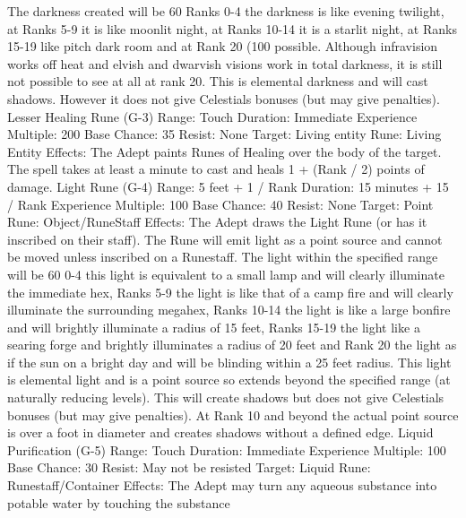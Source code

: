 \documentclass[a4paper]{article}
\begin{document}
\begin{multicols}{3}
The darkness created will be 60%
Ranks 0-4 the darkness is like evening twilight, at
Ranks 5-9 it is like moonlit night, at Ranks 10-14 it
is a starlit night, at Ranks 15-19 like pitch dark
room and at Rank 20 (100%
possible. Although infravision works off heat and
elvish and dwarvish visions work in total darkness,
it is still not possible to see at all at rank 20. This is
elemental darkness and will cast shadows. However it does not give Celestials bonuses (but may
give penalties).
Lesser Healing Rune (G-3)
Range: Touch
Duration: Immediate
Experience Multiple: 200
Base Chance: 35%
Resist: None
Target: Living entity
Rune: Living Entity
Effects: The Adept paints Runes of Healing over
the body of the target. The spell takes at least a
minute to cast and heals 1 + (Rank / 2) points of
damage.
Light Rune (G-4)
Range: 5 feet + 1 / Rank
Duration: 15 minutes + 15 / Rank
Experience Multiple: 100
Base Chance: 40%
Resist: None
Target: Point
Rune: Object/RuneStaff
Effects: The Adept draws the Light Rune (or has it
inscribed on their staff). The Rune will emit light
as a point source and cannot be moved unless
inscribed on a Runestaff. The light within the
specified range will be 60%
0-4 this light is equivalent to a small lamp and will
clearly illuminate the immediate hex, Ranks 5-9
the light is like that of a camp fire and will clearly
illuminate the surrounding megahex, Ranks 10-14
the light is like a large bonfire and will brightly
illuminate a radius of 15 feet, Ranks 15-19 the light
like a searing forge and brightly illuminates a
radius of 20 feet and Rank 20 the light as if the sun
on a bright day and will be blinding within a 25
feet radius.
This light is elemental light and is a point source so
extends beyond the specified range (at naturally
reducing levels). This will create shadows but does
not give Celestials bonuses (but may give penalties). At Rank 10 and beyond the actual point
source is over a foot in diameter and creates shadows without a defined edge.
Liquid Purification (G-5)
Range: Touch
Duration: Immediate
Experience Multiple: 100
Base Chance: 30%
Resist: May not be resisted
Target: Liquid
Rune: Runestaff/Container
Effects: The Adept may turn any aqueous substance into potable water by touching the substance


\end{multicols}
\end{document}
